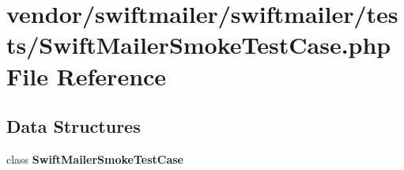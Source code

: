 \section{vendor/swiftmailer/swiftmailer/tests/\+Swift\+Mailer\+Smoke\+Test\+Case.php File Reference}
\label{_swift_mailer_smoke_test_case_8php}
\subsection*{Data Structures}
\begin{DoxyCompactItemize}
\item 
class {\bf Swift\+Mailer\+Smoke\+Test\+Case}
\end{DoxyCompactItemize}
